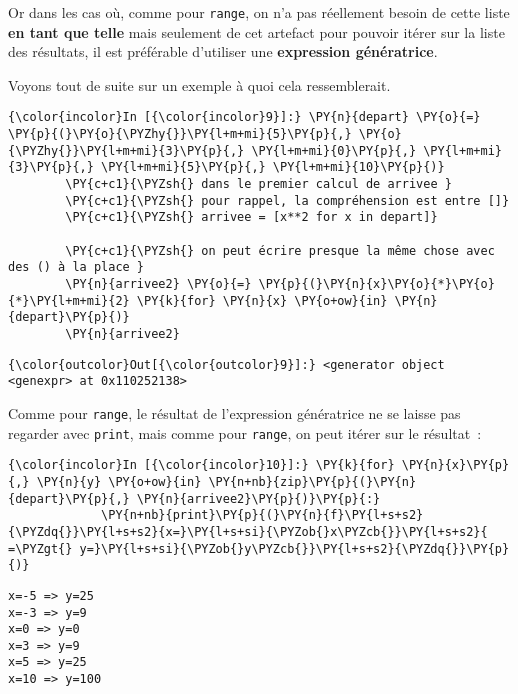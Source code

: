 Or dans les cas où, comme pour \texttt{range}, on n'a pas réellement
besoin de cette liste \textbf{en tant que telle} mais seulement de cet
artefact pour pouvoir itérer sur la liste des résultats, il est
préférable d'utiliser une \textbf{expression génératrice}.

Voyons tout de suite sur un exemple à quoi cela ressemblerait.

    \begin{Verbatim}[commandchars=\\\{\}]
{\color{incolor}In [{\color{incolor}9}]:} \PY{n}{depart} \PY{o}{=} \PY{p}{(}\PY{o}{\PYZhy{}}\PY{l+m+mi}{5}\PY{p}{,} \PY{o}{\PYZhy{}}\PY{l+m+mi}{3}\PY{p}{,} \PY{l+m+mi}{0}\PY{p}{,} \PY{l+m+mi}{3}\PY{p}{,} \PY{l+m+mi}{5}\PY{p}{,} \PY{l+m+mi}{10}\PY{p}{)}
        \PY{c+c1}{\PYZsh{} dans le premier calcul de arrivee }
        \PY{c+c1}{\PYZsh{} pour rappel, la compréhension est entre []}
        \PY{c+c1}{\PYZsh{} arrivee = [x**2 for x in depart]}
        
        \PY{c+c1}{\PYZsh{} on peut écrire presque la même chose avec des () à la place }
        \PY{n}{arrivee2} \PY{o}{=} \PY{p}{(}\PY{n}{x}\PY{o}{*}\PY{o}{*}\PY{l+m+mi}{2} \PY{k}{for} \PY{n}{x} \PY{o+ow}{in} \PY{n}{depart}\PY{p}{)}
        \PY{n}{arrivee2}
\end{Verbatim}


\begin{Verbatim}[commandchars=\\\{\}]
{\color{outcolor}Out[{\color{outcolor}9}]:} <generator object <genexpr> at 0x110252138>
\end{Verbatim}
            
    Comme pour \texttt{range}, le résultat de l'expression génératrice ne se
laisse pas regarder avec \texttt{print}, mais comme pour \texttt{range},
on peut itérer sur le résultat~:

    \begin{Verbatim}[commandchars=\\\{\}]
{\color{incolor}In [{\color{incolor}10}]:} \PY{k}{for} \PY{n}{x}\PY{p}{,} \PY{n}{y} \PY{o+ow}{in} \PY{n+nb}{zip}\PY{p}{(}\PY{n}{depart}\PY{p}{,} \PY{n}{arrivee2}\PY{p}{)}\PY{p}{:}
             \PY{n+nb}{print}\PY{p}{(}\PY{n}{f}\PY{l+s+s2}{\PYZdq{}}\PY{l+s+s2}{x=}\PY{l+s+si}{\PYZob{}x\PYZcb{}}\PY{l+s+s2}{ =\PYZgt{} y=}\PY{l+s+si}{\PYZob{}y\PYZcb{}}\PY{l+s+s2}{\PYZdq{}}\PY{p}{)}
\end{Verbatim}


    \begin{Verbatim}[commandchars=\\\{\}]
x=-5 => y=25
x=-3 => y=9
x=0 => y=0
x=3 => y=9
x=5 => y=25
x=10 => y=100

    \end{Verbatim}

